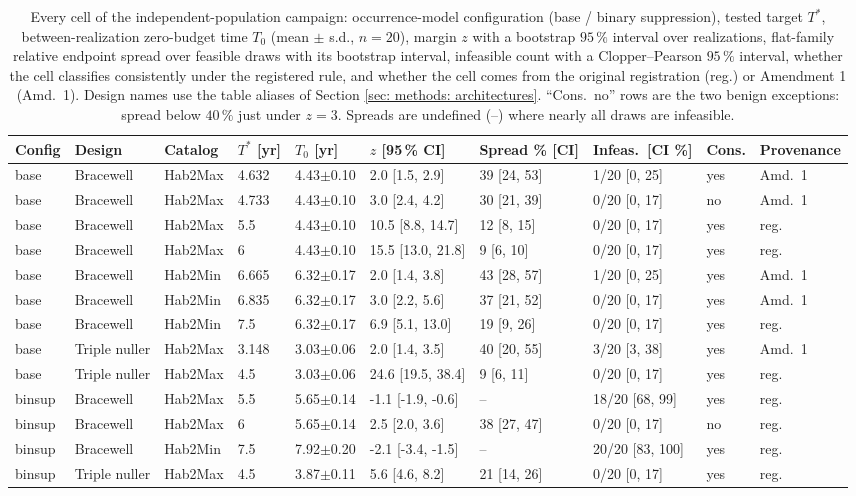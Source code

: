 \documentclass[12pt,a4paper]{article}
\numberwithin{equation}{section}
\numberwithin{figure}{section}
\numberwithin{table}{section}
\begin{document}
\begin{table}[htbp]
\centering
\scriptsize
\setlength{\tabcolsep}{2.5pt}
\begin{tabular}{@{}llllllllll@{}}
\toprule
Config & Design & Catalog & $T^\ast$ [yr] & $T_0$ [yr] & $z$ [95\,\% CI] & Spread \% [CI] & Infeas.\ [CI \%] & Cons. & Provenance \\
\midrule
base & Bracewell & Hab2Max & 4.632 & 4.43$\pm$0.10 & 2.0 [1.5, 2.9] & 39 [24, 53] & 1/20 [0, 25] & yes & Amd.\ 1 \\
base & Bracewell & Hab2Max & 4.733 & 4.43$\pm$0.10 & 3.0 [2.4, 4.2] & 30 [21, 39] & 0/20 [0, 17] & no & Amd.\ 1 \\
base & Bracewell & Hab2Max & 5.5 & 4.43$\pm$0.10 & 10.5 [8.8, 14.7] & 12 [8, 15] & 0/20 [0, 17] & yes & reg. \\
base & Bracewell & Hab2Max & 6 & 4.43$\pm$0.10 & 15.5 [13.0, 21.8] & 9 [6, 10] & 0/20 [0, 17] & yes & reg. \\
base & Bracewell & Hab2Min & 6.665 & 6.32$\pm$0.17 & 2.0 [1.4, 3.8] & 43 [28, 57] & 1/20 [0, 25] & yes & Amd.\ 1 \\
base & Bracewell & Hab2Min & 6.835 & 6.32$\pm$0.17 & 3.0 [2.2, 5.6] & 37 [21, 52] & 0/20 [0, 17] & yes & Amd.\ 1 \\
base & Bracewell & Hab2Min & 7.5 & 6.32$\pm$0.17 & 6.9 [5.1, 13.0] & 19 [9, 26] & 0/20 [0, 17] & yes & reg. \\
base & Triple nuller & Hab2Max & 3.148 & 3.03$\pm$0.06 & 2.0 [1.4, 3.5] & 40 [20, 55] & 3/20 [3, 38] & yes & Amd.\ 1 \\
base & Triple nuller & Hab2Max & 4.5 & 3.03$\pm$0.06 & 24.6 [19.5, 38.4] & 9 [6, 11] & 0/20 [0, 17] & yes & reg. \\
binsup & Bracewell & Hab2Max & 5.5 & 5.65$\pm$0.14 & -1.1 [-1.9, -0.6] & -- & 18/20 [68, 99] & yes & reg. \\
binsup & Bracewell & Hab2Max & 6 & 5.65$\pm$0.14 & 2.5 [2.0, 3.6] & 38 [27, 47] & 0/20 [0, 17] & no & reg. \\
binsup & Bracewell & Hab2Min & 7.5 & 7.92$\pm$0.20 & -2.1 [-3.4, -1.5] & -- & 20/20 [83, 100] & yes & reg. \\
binsup & Triple nuller & Hab2Max & 4.5 & 3.87$\pm$0.11 & 5.6 [4.6, 8.2] & 21 [14, 26] & 0/20 [0, 17] & yes & reg. \\
\bottomrule
\end{tabular}
\caption{Every cell of the independent-population campaign: occurrence-model configuration (base / binary suppression), tested target $T^\ast$, between-realization zero-budget time $T_0$ (mean $\pm$ s.d., $n=20$), margin $z$ with a bootstrap $95\,\%$ interval over realizations, flat-family relative endpoint spread over feasible draws with its bootstrap interval, infeasible count with a Clopper--Pearson $95\,\%$ interval, whether the cell classifies consistently under the registered rule, and whether the cell comes from the original registration (reg.) or Amendment 1 (Amd.\ 1). Design names use the table aliases of Section \ref{sec: methods: architectures}. ``Cons.\ no'' rows are the two benign exceptions: spread below $40\,\%$ just under $z=3$. Spreads are undefined (--) where nearly all draws are infeasible.}
\label{tab: independent matrix}
\end{table}
\end{document}

